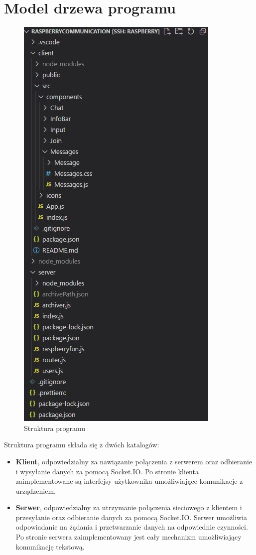 \section{Model drzewa programu}
\begin{figure}[htbp]
	\centering
	\includegraphics[width=0.5\linewidth]{"obrazy/model"}
	\caption{Struktura programu}
	\label{fig:6}
\end{figure}
Struktura programu składa się z dwóch katalogów: 

\begin{itemize}  
	\item \textbf{ Klient}, odpowiedzialny za nawiązanie połączenia z serwerem oraz odbieranie i wysyłanie danych za pomocą Socket.IO. Po stronie klienta zaimplementowane są interfejsy użytkownika umożliwiające komunikacje z urządzeniem.
	\\
	\item \textbf{ Serwer}, odpowiedzialny za utrzymanie połączenia sieciowego z klientem i przesyłanie oraz odbieranie danych za pomocą Socket.IO. Serwer umożliwia odpowiadanie na żądania i przetwarzanie danych na odpowiednie czynności. Po stronie serwera zaimplementowany jest cały mechanizm umożliwiający komunikację tekstową. 
	\\
\end{itemize}
